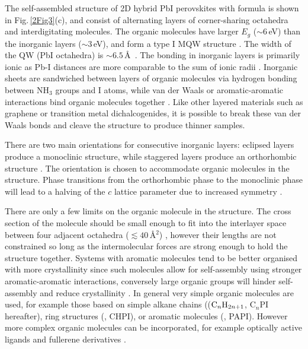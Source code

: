 The self-assembled structure of 2D hybrid PbI perovskites with formula  is shown in Fig.\,\ref{2Fig3}(c), and consist of alternating layers of corner-sharing  octahedra and interdigitating  molecules. The organic molecules have larger $E_g$ ($\sim6$\,eV) than the inorganic layers ($\sim3$\,eV), and form a type I MQW structure \cite{Ishihara1994, Pradeesh2009b}. The width of the QW (PbI octahedra) is $\sim6.5$\,\AA~\cite{Ishihara1989}. The bonding in inorganic layers is primarily ionic as Pb-I distances are more comparable to the sum of ionic radii \cite{Mousdis2000}. Inorganic sheets are sandwiched between layers of organic molecules via hydrogen bonding between $\textrm{NH}_3$ groups and I atoms, while van der Waals or aromatic-aromatic interactions bind organic molecules together \cite{Mitzi2001a}. Like other layered materials such as graphene or transition metal dichalcogenides, it is possible to break these van der Waals bonds and cleave the structure to produce thinner samples.

There are two main orientations for consecutive inorganic layers: eclipsed layers produce a monoclinic structure, while staggered layers produce an orthorhombic structure \cite{Billing2006}. The orientation is chosen to accommodate organic molecules in the structure. Phase transitions from the orthorhombic phase to the monoclinic phase will lead to a halving of the $c$ lattice parameter due to increased symmetry \cite{Billing2008}.

There are only a few limits on the organic molecule  in the structure. The cross section of the molecule should be small enough to fit into the interlayer space between four adjacent octahedra ($\lesssim 40$\,\AA$^2$) \cite{Mitzi2001a}, however their lengths are not constrained so long as the intermolecular forces are strong enough to hold the structure together. Systems with aromatic molecules tend to be better organised with more crystallinity since such molecules allow for self-assembly using stronger aromatic-aromatic interactions, conversely large organic groups will hinder self-assembly and reduce crystallinity \cite{Zhang2009}. In general very simple organic molecules are used, for example those based on simple alkane chains (($\textnormal{C}_n\textnormal{H}_{2n+1}$, C$_n$PI hereafter), ring structures (, CHPI), or aromatic molecules (, PAPI). However more complex organic molecules can be incorporated, for example optically active ligands \cite{Billing2006, Teshima2003} and fullerene derivatives \cite{Kikuchi2005, Kawabata2009}. 

